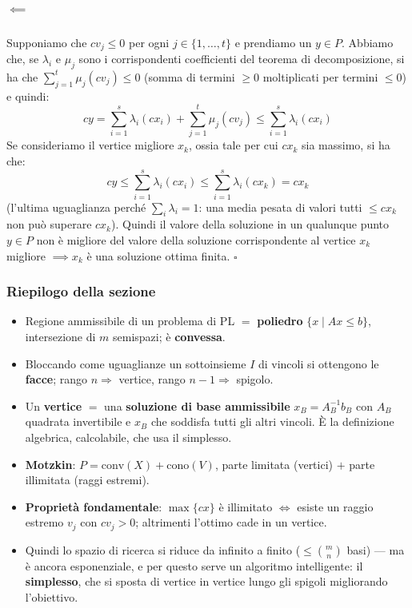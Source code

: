 \documentclass[12pt]{extarticle} %
\begin{document}
\subparagraph{$\impliedby$} Supponiamo che $cv_j \le 0$ per ogni $j \in \{1, \dots, t\}$ e prendiamo un $y \in P$. Abbiamo che, se $\lambda_i$ e $\mu_j$ sono i corrispondenti coefficienti del teorema di decomposizione, si ha che $\sum_{j=1}^t \mu_j (cv_j) \le 0$ (somma di termini $\ge0$ moltiplicati per termini $\le0$) e quindi:
\[ cy = \sum_{i=1}^s \lambda_i (cx_i) + \sum_{j=1}^t \mu_j (cv_j) \le \sum_{i=1}^s \lambda_i (cx_i) \]
Se consideriamo il vertice migliore $x_k$, ossia tale per cui $cx_k$ sia massimo, si ha che:
\[ cy \le \sum_{i=1}^s \lambda_i (cx_i) \le \sum_{i=1}^s \lambda_i (cx_k) = cx_k \]
(l'ultima uguaglianza perché $\sum_i \lambda_i = 1$: una media pesata di valori tutti $\le cx_k$ non può superare $cx_k$).
Quindi il valore della soluzione in un qualunque punto $y \in P$ non è migliore del valore della soluzione corrispondente al vertice $x_k$ migliore $\implies x_k$ è una soluzione ottima finita. \hfill$\square$

\subsubsection{Riepilogo della sezione}
\begin{itemize}
    \item Regione ammissibile di un problema di PL $=$ \textbf{poliedro} $\{x \mid Ax\le b\}$, intersezione di $m$ semispazi; è \textbf{convessa}.
    \item Bloccando come uguaglianze un sottoinsieme $I$ di vincoli si ottengono le \textbf{facce}; rango $n \Rightarrow$ vertice, rango $n-1 \Rightarrow$ spigolo.
    \item Un \textbf{vertice} $=$ una \textbf{soluzione di base ammissibile} $x_B = A_B^{-1}b_B$ con $A_B$ quadrata invertibile e $x_B$ che soddisfa tutti gli altri vincoli. È la definizione algebrica, calcolabile, che usa il simplesso.
    \item \textbf{Motzkin}: $P = \text{conv}(X) + \text{cono}(V)$, parte limitata (vertici) $+$ parte illimitata (raggi estremi).
    \item \textbf{Proprietà fondamentale}: $\max\{cx\}$ è illimitato $\iff$ esiste un raggio estremo $v_j$ con $cv_j>0$; altrimenti l'ottimo cade in un vertice.
    \item Quindi lo spazio di ricerca si riduce da infinito a finito ($\le \binom{m}{n}$ basi) --- ma è ancora esponenziale, e per questo serve un algoritmo intelligente: il \textbf{simplesso}, che si sposta di vertice in vertice lungo gli spigoli migliorando l'obiettivo.
\end{itemize}
\end{document}
